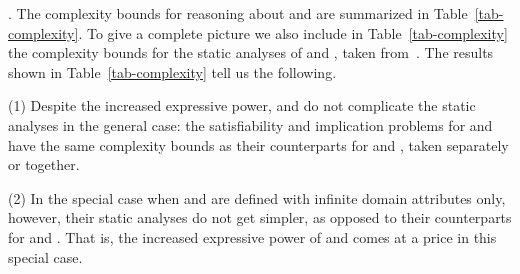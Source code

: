 . The complexity bounds for reasoning about
\pCFDs and \pCINDs are summarized in Table~\ref{tab-complexity}.
To give a complete picture we also include
in Table~\ref{tab-complexity} the complexity bounds for
the static analyses of
\CFDs and \CINDs, taken from~\cite{CFDs,tcs-CINDs}. The results shown in
Table~\ref{tab-complexity} tell us the following.

\sstab
(1) Despite the increased expressive
power, \pCFDs and \pCINDs do not complicate the static analyses in the general case: the
satisfiability and implication problems for \pCFDs and \pCINDs have
the same complexity bounds as their
counterparts for \CFDs and \CINDs, taken separately or together.

\sstab
(2) In the special case when \pCFDs and \pCINDs are defined
with infinite domain attributes only, however, their
static analyses do not get simpler, as opposed to their counterparts for
\CFDs and \CINDs. That is, the increased expressive power of \pCFDs and \pCINDs comes at a price in this special case.
